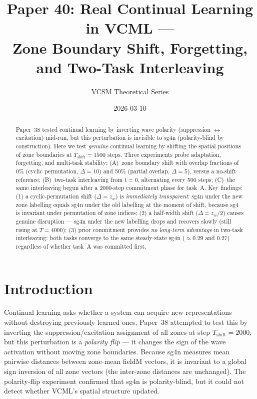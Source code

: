 \documentclass[11pt]{article}
\title{\textbf{Paper 40: Real Continual Learning in VCML ---\\
Zone Boundary Shift, Forgetting, and Two-Task Interleaving}}
\author{VCSM Theoretical Series}
\date{2026-03-10}
\begin{document}
\maketitle

\begin{abstract}
Paper~38 tested continual learning by inverting wave polarity (suppression $\leftrightarrow$
excitation) mid-run, but this perturbation is invisible to sg4n (polarity-blind by
construction).  Here we test \emph{genuine} continual learning by shifting the spatial
positions of zone boundaries at $T_\mathrm{shift} = 1500$ steps.
Three experiments probe adaptation, forgetting, and multi-task stability:
(A)~zone boundary shift with overlap fractions of 0\% (cyclic permutation, $\Delta=10$)
and 50\% (partial overlap, $\Delta=5$), versus a no-shift reference;
(B)~two-task interleaving from $t=0$, alternating every 500 steps;
(C)~the same interleaving begun after a 2000-step commitment phase for task~A.
Key findings:
(1) a cyclic-permutation shift ($\Delta = z_w$) is \emph{immediately transparent}:
sg4n under the new zone labelling equals sg4n under the old labelling at the moment of
shift, because sg4 is invariant under permutation of zone indices;
(2) a half-width shift ($\Delta = z_w/2$) causes genuine disruption --- sg4n under the
new labelling drops and recovers slowly (still rising at $T=4000$);
(3) prior commitment provides \emph{no long-term advantage} in two-task interleaving:
both tasks converge to the same steady-state sg4n ($\approx 0.29$ and $0.27$) regardless
of whether task~A was committed first.
\end{abstract}

\section{Introduction}

Continual learning asks whether a system can acquire new representations without
destroying previously learned ones.
Paper~38 attempted to test this by inverting the suppression/excitation assignment of all
zones at step $T_\mathrm{shift} = 2000$, but this perturbation is a \emph{polarity flip}
--- it changes the sign of the wave activation without moving zone boundaries.
Because sg4n measures mean pairwise distances between zone-mean fieldM vectors, it is
invariant to a global sign inversion of all zone vectors (the inter-zone distances are
unchanged).
The polarity-flip experiment confirmed that sg4n is polarity-blind, but it could not
detect whether VCML's spatial structure updated.
\end{document}
